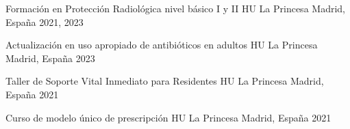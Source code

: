 \begin{cventries}
  \cventry
    {Formación en Protección Radiológica nivel básico I y II} %
    {HU La Princesa} %
    {Madrid, España} %
    {2021, 2023} %
    {}

  \cventry
    {Actualización en uso apropiado de antibióticos en adultos} %
    {HU La Princesa} %
    {Madrid, España} %
    {2023} %
    {}

  \cventry
    {Taller de Soporte Vital Inmediato para Residentes} %
    {HU La Princesa} %
    {Madrid, España} %
    {2021} %
    {}

  \cventry
    {Curso de modelo único de prescripción} %
    {HU La Princesa} %
    {Madrid, España} %
    {2021} %
    {}

\end{cventries}

